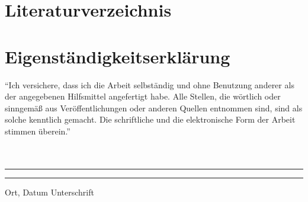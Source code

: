 \documentclass[12pt, a4paper, oneside]{article}
\begin{document}

\makeatother


\lstset{style=mystyle}
















\section{Literaturverzeichnis}
\printbibliography
\section{Eigenständigkeitserklärung}
``Ich versichere, dass ich die Arbeit selbständig und ohne Benutzung anderer als der angegebenen Hilfsmittel angefertigt habe. Alle Stellen, die wörtlich oder sinngemäß aus Veröffentlichungen oder anderen Quellen entnommen sind, sind als solche kenntlich gemacht. Die schriftliche und die elektronische Form der Arbeit stimmen überein.''
\paragraph{}$~~$\\
\paragraph{}$~~$\\
\vspace{50pt} 
\noindent\rule{5cm}{.4pt}\hfill\rule{5cm}{.4pt}\par 
\noindent Ort, Datum \hfill Unterschrift 


\end{document}
